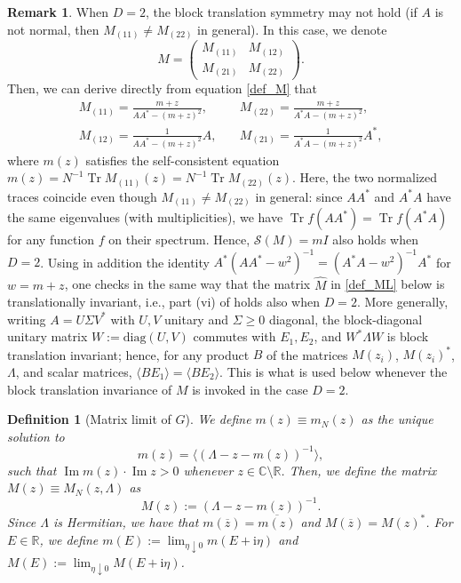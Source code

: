 \documentclass[10pt,reqno]{amsart}
\numberwithin{equation}{section}
\numberwithin{figure}{section}
\theoremstyle{plain} %
\newtheorem{definition}[theorem]{Definition}
\theoremstyle{definition} %
\newtheorem{remark}[theorem]{Remark}
\newcommand{\cal}{\mathcal}
\newcommand{\wh}{\widehat}
\newcommand{\R}{\mathbb{R}}
\newcommand{\C}{\mathbb{C}}
\newcommand{\ii}{\mathrm{i}}
\renewcommand{\bar}{\overline}
\newcommand{\diag}{\mathrm{diag}}
\DeclareMathOperator{\tr}{\mathrm{Tr}}
\DeclareMathOperator{\im}{\mathrm{Im}}
\newcommand{\be}{\begin{equation}}
\newcommand{\ee}{\end{equation}}
\numberwithin{equation}{section}
\begin{document}
\begin{remark}\label{rmk:D2}
When $D=2$, the block translation symmetry may not hold (if $A$ is not normal, then $M_{(11)}\ne M_{(22)}$ in general). In this case, we denote
$$M=\begin{pmatrix}
M_{(11)} & M_{(12)} \\
M_{(21)} & M_{(22)}
\end{pmatrix}.%
$$
Then, we can derive directly from equation \eqref{def_M} that 
\be\label{eq:MD=2}
\begin{aligned}
    M_{(11)}=\frac{m+z}{AA^*-(m+z)^2},\quad &   M_{(22)}=\frac{m+z}{A^*A-(m+z)^2},\\  M_{(12)}=\frac{1}{AA^*-(m+z)^2}A,\quad & M_{(21)}=\frac{1}{A^*A-(m+z)^2}A^*,
\end{aligned} 
\ee
where $m(z)$ satisfies the self-consistent equation
$m(z)=N^{-1}\tr M_{(11)}(z)=N^{-1}\tr M_{(22)}(z).$
Here, the two normalized traces coincide even though $M_{(11)}\ne M_{(22)}$ in general: since $AA^*$ and $A^*A$ have the same eigenvalues (with multiplicities), we have $\tr f(AA^*)=\tr f(A^*A)$ for any function $f$ on their spectrum. Hence, $\cal S(M)=mI$ also holds when $D=2$. Using in addition the identity $A^*(AA^*-w^2)^{-1}=(A^*A-w^2)^{-1}A^*$ for $w=m+z$, one checks in the same way that the matrix $\wh M$ in \eqref{def_ML} below is translationally invariant, i.e., part (vi) of  holds also when $D=2$. More generally, writing $A=U\Sigma V^*$ with $U,V$ unitary and $\Sigma\ge 0$ diagonal, the block-diagonal unitary matrix $W:=\diag(U,V)$ commutes with $E_1,E_2$, and $W^*\Lambda W$ is block translation invariant; hence, for any product $B$ of the matrices $M(z_i)$, $M(z_i)^*$, $\Lambda$, and scalar matrices, $\langle BE_1\rangle=\langle BE_2\rangle$. This is what is used below whenever the block translation invariance of $M$ is invoked in the case $D=2$.
\end{remark}


 \begin{definition}[Matrix limit of $G$]\label{defn_Mm}
 We define $m(z)\equiv m_N(z)$ as the unique solution to 
 \be\label{self_m}
m(z)= \big\langle \left(\Lambda -z- m(z)\right)^{-1} \big\rangle ,
\ee
 such that $\im m(z)\cdot\im z>0$ whenever $z\in \C\setminus\R$.
 Then, we define the matrix $M(z)\equiv M_N(z,\Lambda)$ as
\be\label{def_G0}
M(z):= \left(\Lambda -z- m(z)\right)^{-1}.
 \ee
Since $\Lambda$ is Hermitian, we have that $m(\bar z)= \overline {m(z)}$ and $M(\bar z)=M(z)^*$. For $E\in\R$, we define $m(E):=\lim_{\eta\downarrow 0}m(E+\ii\eta)$ and $M(E):=\lim_{\eta\downarrow 0}M(E+\ii\eta)$.
 \end{definition}
\end{document}
